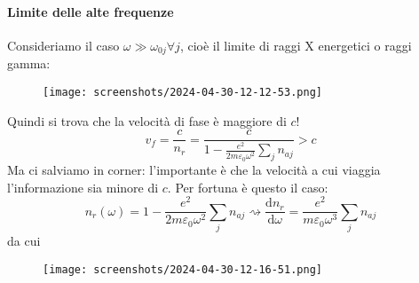 \paragraph{Limite delle alte frequenze}
Consideriamo il caso \(\omega \gg \omega _{0j} \forall j\), cioè il limite di raggi X energetici o raggi gamma:
\begin{figure}[H]
	\centering
	\texttt{[image: screenshots/2024-04-30-12-12-53.png]}
\end{figure}
Quindi si trova che la velocità di fase è maggiore di \(c\)!
\begin{equation}
	v_f = \frac{c}{n_r} = \frac{c}{1- \frac{e^{2} }{2m \varepsilon _0 \omega ^{2} }\sum_{j}n_{aj} } > c
\end{equation}
Ma ci salviamo in corner: l'importante è che la velocità a cui viaggia l'informazione sia minore di \(c\). Per fortuna è questo il caso:
\begin{equation}
	n_r(\omega )=1- \frac{e^{2} }{2 m \varepsilon _0 \omega ^{2} }\sum_{j} n_{aj} \rightsquigarrow \frac{\mathrm{d}n_r}{\mathrm{d}\omega } = \frac{e ^{2} }{m \varepsilon _0 \omega ^{3}} \sum_{j}n_{aj}    
\end{equation}
da cui
\begin{figure}[H]
	\centering
	\texttt{[image: screenshots/2024-04-30-12-16-51.png]}
\end{figure}